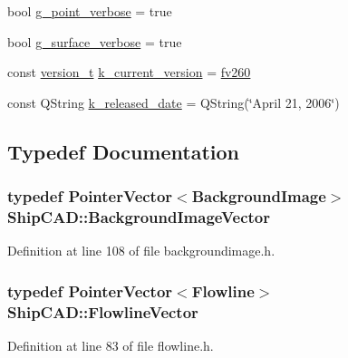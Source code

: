 \begin{DoxyCompactItemize}
\item 
bool \hyperlink{namespaceShipCAD_ae059a88fbc18c56ceee2fd1cd7f2aad0}{g\-\_\-point\-\_\-verbose} = true
\item 
bool \hyperlink{namespaceShipCAD_a45538d3cd2c9293bf0bd4b09a23670ac}{g\-\_\-surface\-\_\-verbose} = true
\item 
const \hyperlink{namespaceShipCAD_af3a6fa23a7318acbda7b0066b53d694f}{version\-\_\-t} \hyperlink{namespaceShipCAD_aa3415e1acf9bdb19e24f31f5138d6a60}{k\-\_\-current\-\_\-version} = \hyperlink{namespaceShipCAD_af3a6fa23a7318acbda7b0066b53d694fa3e815680f28b362a51b70712e376e7d7}{fv260}
\item 
const Q\-String \hyperlink{namespaceShipCAD_a833fc6d39d2f0fd7fa31d0a691b0b726}{k\-\_\-released\-\_\-date} = Q\-String(\char`\"{}April 21, 2006\char`\"{})
\end{DoxyCompactItemize}


\subsection{Typedef Documentation}
\hypertarget{namespaceShipCAD_ac421659cf582dda585c31351043a79d3}{
\subsubsection[{Background\-Image\-Vector}]{\setlength{\rightskip}{0pt plus 5cm}typedef {\bf Pointer\-Vector}$<${\bf Background\-Image}$>$ {\bf Ship\-C\-A\-D\-::\-Background\-Image\-Vector}}}\label{namespaceShipCAD_ac421659cf582dda585c31351043a79d3}


Definition at line 108 of file backgroundimage.\-h.

\hypertarget{namespaceShipCAD_a266f1cbe13c1087079b277baa825b85d}{
\subsubsection[{Flowline\-Vector}]{\setlength{\rightskip}{0pt plus 5cm}typedef {\bf Pointer\-Vector}$<${\bf Flowline}$>$ {\bf Ship\-C\-A\-D\-::\-Flowline\-Vector}}}\label{namespaceShipCAD_a266f1cbe13c1087079b277baa825b85d}


Definition at line 83 of file flowline.\-h.

